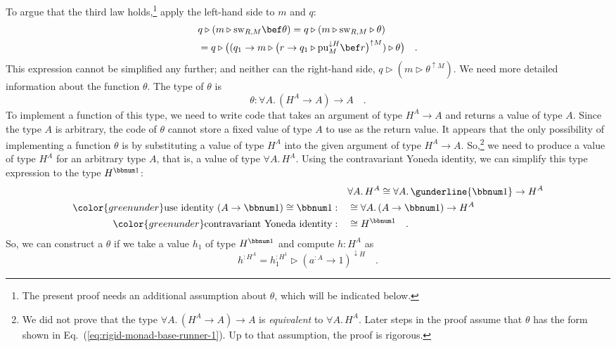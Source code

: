 To argue that the third law holds,\footnote{The present proof needs an additional assumption about $\theta$,
which will be indicated below.} apply the left-hand side to $m$ and $q$:
\begin{align}
 & q\triangleright(m\triangleright\text{sw}_{R,M}\bef\theta)=q\triangleright(m\triangleright\text{sw}_{R,M}\triangleright\theta)\nonumber \\
 & =q\triangleright\big((q_{1}\rightarrow m\triangleright\big(r\rightarrow q_{1}\triangleright\text{pu}_{M}^{\downarrow H}\bef r\big)^{\uparrow M})\triangleright\theta\big)\quad.\label{eq:rigid-monad-1-derivation7}
\end{align}
This expression cannot be simplified any further; and neither can
the right-hand side, $q\triangleright(m\triangleright\theta^{\uparrow M})$.
We need more detailed information about the function $\theta$. The
type of $\theta$ is
\[
\theta:\forall A.\,(H^{A}\rightarrow A)\rightarrow A\quad.
\]
To implement a function of this type, we need to write code that takes
an argument of type $H^{A}\rightarrow A$ and returns a value of type
$A$. Since the type $A$ is arbitrary, the code of $\theta$ cannot
store a fixed value of type $A$ to use as the return value. It appears
that the only possibility of implementing a function $\theta$ is
by substituting a value of type $H^{A}$ into the given argument of
type $H^{A}\rightarrow A$. So,\footnote{We did not prove that the type $\forall A.\,(H^{A}\rightarrow A)\rightarrow A$
is \emph{equivalent} to $\forall A.\,H^{A}$. Later steps in the proof
assume that $\theta$ has the form shown in Eq.~(\ref{eq:rigid-monad-base-runner-1}).
Up to that assumption, the proof is rigorous.} we need to produce a value of type $H^{A}$ for an arbitrary type
$A$, that is, a value of type $\forall A.\,H^{A}$. Using the contravariant
Yoneda identity, we can simplify this type expression to the type
$H^{\bbnum 1}$:
\begin{align*}
 & \forall A.\,H^{A}\cong\forall A.\,\gunderline{\bbnum 1}\rightarrow H^{A}\\
{\color{greenunder}\text{use identity }(A\rightarrow\bbnum 1)\cong\bbnum 1:}\quad & \cong\forall A.\,(A\rightarrow\bbnum 1)\rightarrow H^{A}\\
{\color{greenunder}\text{contravariant Yoneda identity}:}\quad & \cong H^{\bbnum 1}\quad.
\end{align*}
So, we can construct a $\theta$ if we take a value $h_{1}$ of type
$H^{\bbnum 1}$ and compute $h:H^{A}$ as
\[
h^{:H^{A}}=h_{1}^{:H^{1}}\triangleright(a^{:A}\rightarrow1)^{\downarrow H}\quad.
\]
